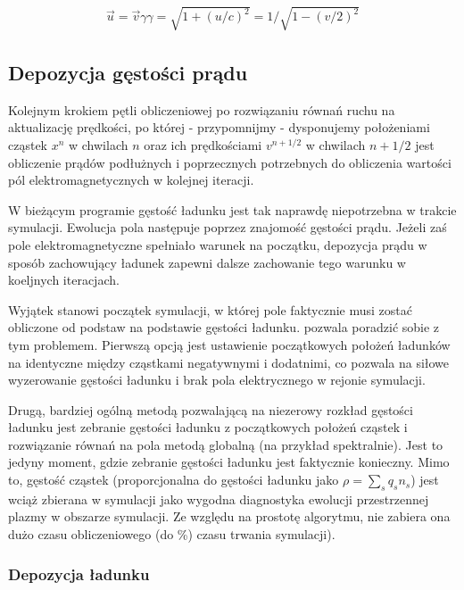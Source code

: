 \begin{align}
    \vec{u} = \vec{v} \gamma
    \gamma = \sqrt{1+{(u/c)}^2} = 1/\sqrt{1-{(v/2)}^2}
    \label{eqn:gamma-transformation}
\end{align}

\subsection{Depozycja gęstości prądu}

Kolejnym krokiem pętli obliczeniowej po rozwiązaniu równań ruchu na
aktualizację prędkości, po której - przypomnijmy - dysponujemy położeniami
cząstek $x^n$ w chwilach $n$ oraz ich prędkościami $v^{n+1/2}$ w chwilach
$n+1/2$   jest obliczenie prądów podłużnych i
poprzecznych potrzebnych do obliczenia wartości pól elektromagnetycznych w
kolejnej iteracji.

W bieżącym programie gęstość ładunku jest tak naprawdę niepotrzebna w
trakcie symulacji. Ewolucja pola następuje poprzez znajomość gęstości prądu.
Jeżeli zaś pole elektromagnetyczne spełniało warunek  na początku, depozycja prądu w sposób zachowujący ładunek zapewni
dalsze zachowanie tego warunku w koeljnych iteracjach.

Wyjątek stanowi początek symulacji, w której pole faktycznie musi zostać
obliczone od podstaw na podstawie gęstości ładunku.  pozwala
poradzić sobie z tym problemem. Pierwszą opcją jest ustawienie początkowych
położeń ładunków na identyczne między cząstkami negatywnymi i dodatnimi, co
pozwala na siłowe wyzerowanie gęstości ładunku i brak pola elektrycznego w
rejonie symulacji.

Drugą, bardziej ogólną metodą pozwalającą na niezerowy rozkład gęstości
ładunku  jest zebranie gęstości ładunku z początkowych położeń cząstek i
rozwiązanie równań na pola metodą globalną (na przykład spektralnie). Jest
to jedyny moment, gdzie zebranie gęstości ładunku jest faktycznie konieczny.
Mimo to, gęstość cząstek (proporcjonalna do gęstości ładunku jako $\rho =
\sum_s q_s n_s$) jest wciąż zbierana w symulacji jako wygodna diagnostyka
ewolucji przestrzennej plazmy w obszarze symulacji. Ze względu na prostotę
algorytmu, nie zabiera ona dużo czasu obliczeniowego (do
\%) czasu trwania symulacji).

\subsubsection{Depozycja ładunku}

